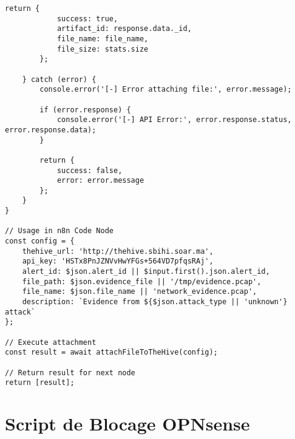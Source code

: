 \begin{lstlisting}[style=jsstyle,caption=Script n8n pour attachement de fichiers TheHive]
        return {
            success: true,
            artifact_id: response.data._id,
            file_name: file_name,
            file_size: stats.size
        };

    } catch (error) {
        console.error('[-] Error attaching file:', error.message);
        
        if (error.response) {
            console.error('[-] API Error:', error.response.status, error.response.data);
        }
        
        return {
            success: false,
            error: error.message
        };
    }
}

// Usage in n8n Code Node
const config = {
    thehive_url: 'http://thehive.sbihi.soar.ma',
    api_key: 'HSTx8PnJZNVvHwYFGs+564VD7pfqsRAj',
    alert_id: $json.alert_id || $input.first().json.alert_id,
    file_path: $json.evidence_file || '/tmp/evidence.pcap',
    file_name: $json.file_name || 'network_evidence.pcap',
    description: `Evidence from ${$json.attack_type || 'unknown'} attack`
};

// Execute attachment
const result = await attachFileToTheHive(config);

// Return result for next node
return [result];
\end{lstlisting}

\section{Script de Blocage OPNsense}

